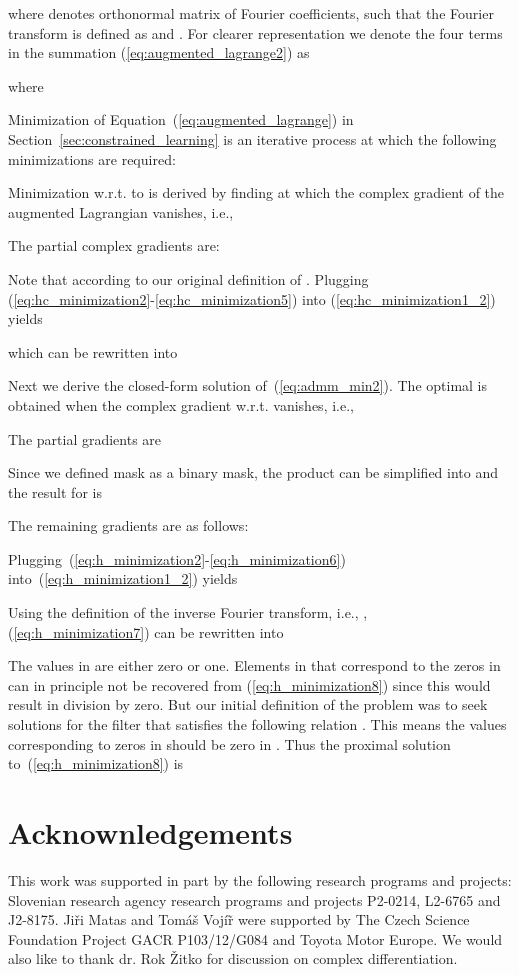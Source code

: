 \documentclass[twocolumn]{article}
\begin{document}
where  denotes  orthonormal matrix of Fourier coefficients, such that the Fourier transform is defined as  and . For clearer representation we denote the four terms in the summation (\ref{eq:augmented_lagrange2}) as

where 




Minimization of Equation~(\ref{eq:augmented_lagrange}) in Section~\ref{sec:constrained_learning} is an iterative process at which the following minimizations are required:

Minimization w.r.t. to  is derived by finding  at which the complex gradient of the augmented Lagrangian vanishes, i.e.,

The partial complex gradients are:







Note that  according to our original definition of . Plugging (\ref{eq:hc_minimization2}-\ref{eq:hc_minimization5}) into (\ref{eq:hc_minimization1_2}) yields

which can be rewritten into

Next we derive the closed-form solution of~(\ref{eq:admm_min2}). The optimal  is obtained when the complex gradient w.r.t.  vanishes, i.e.,


The partial gradients are 


Since we defined mask  as a binary mask, the product  can be simplified into  and the result for  is

The remaining gradients are as follows:



Plugging~(\ref{eq:h_minimization2}-\ref{eq:h_minimization6}) into~(\ref{eq:h_minimization1_2}) yields 

Using the definition of the inverse Fourier transform, i.e., , (\ref{eq:h_minimization7}) can be rewritten into

The values in  are either zero or one. Elements in  that correspond to the zeros in  can in principle not be recovered from (\ref{eq:h_minimization8}) since this would result in division by zero. But our initial definition of the problem was to seek solutions for the filter that satisfies the following relation . This means the values corresponding to zeros in  should be zero in . Thus the proximal solution to~(\ref{eq:h_minimization8}) is 


\section*{Acknownledgements}
This work was supported in part by the following research programs and projects: Slovenian research agency research programs and projects P2-0214, L2-6765 and J2-8175. Ji\v{r}i Matas and Tom{\'a}\v{s} Voj\'{i}\~{r} were supported by The Czech Science Foundation Project GACR P103/12/G084 and Toyota Motor Europe. We would also like to thank dr. Rok Žitko for discussion on complex differentiation. 






\end{document}
